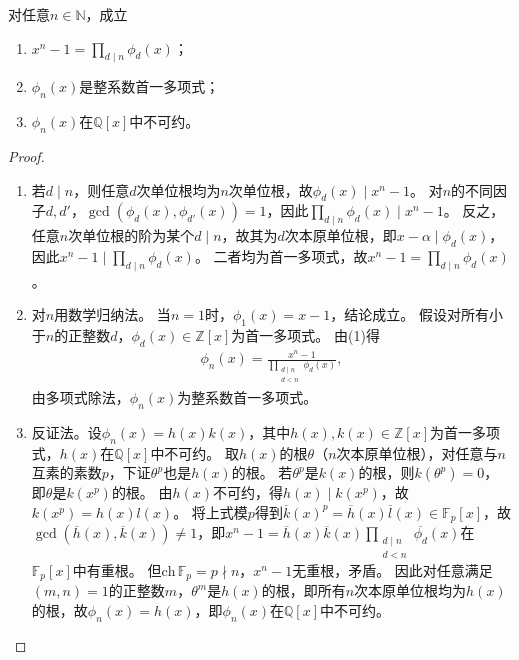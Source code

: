 \documentclass[../../main.tex]{subfiles}%
\begin{document}
\begin{theorem}
对任意$n\in\mathbb{N}$，成立
\begin{enumerate}[(1)]
\item $x^n-1=\prod\limits_{d\mid n}\phi_d(x)$；
\item $\phi_n(x)$是整系数首一多项式；
\item $\phi_n(x)$在$\mathbb{Q}[x]$中不可约。
\end{enumerate}
\end{theorem}
\begin{proof}
\begin{enumerate}[(1)]
\item 若$d\mid n$，则任意$d$次单位根均为$n$次单位根，故$\phi_d(x)\mid x^n-1$。
对$n$的不同因子$d,d'$，$\gcd(\phi_d(x),\phi_{d'}(x))=1$，因此$\prod\limits_{d\mid n}\phi_d(x)\mid x^n-1$。
反之，任意$n$次单位根的阶为某个$d\mid n$，故其为$d$次本原单位根，即$x-\alpha\mid\phi_d(x)$，因此$x^n-1\mid\prod\limits_{d\mid n}\phi_d(x)$。
二者均为首一多项式，故$x^n-1=\prod\limits_{d\mid n}\phi_d(x)$。

\item 对$n$用数学归纳法。
当$n=1$时，$\phi_1(x)=x-1$，结论成立。
假设对所有小于$n$的正整数$d$，$\phi_d(x)\in\mathbb{Z}[x]$为首一多项式。
由(1)得
\begin{align*}
\phi_n(x)=\frac{x^n-1}{\prod\limits_{\substack{d\mid n\\d<n}}\phi_d(x)},
\end{align*}
由多项式除法，$\phi_n(x)$为整系数首一多项式。

\item 反证法。设$\phi_n(x)=h(x)k(x)$，其中$h(x),k(x)\in\mathbb{Z}[x]$为首一多项式，$h(x)$在$\mathbb{Q}[x]$中不可约。
取$h(x)$的根$\theta$（$n$次本原单位根），对任意与$n$互素的素数$p$，下证$\theta^p$也是$h(x)$的根。
若$\theta^p$是$k(x)$的根，则$k(\theta^p)=0$，即$\theta$是$k(x^p)$的根。
由$h(x)$不可约，得$h(x)\mid k(x^p)$，故$k(x^p)=h(x)l(x)$。
将上式模$p$得到$\overline{k}(x)^p=\overline{h}(x)\overline{l}(x)\in\mathbb{F}_p[x]$，故$\gcd(\overline{h}(x),\overline{k}(x))\neq1$，即$x^n-1=\overline{h}(x)\overline{k}(x)\prod\limits_{\substack{d\mid n\\d<n}}\overline{\phi_d}(x)$在$\mathbb{F}_p[x]$中有重根。
但$\mathrm{ch}\,\mathbb{F}_p=p\nmid n$，$x^n-1$无重根，矛盾。
因此对任意满足$(m,n)=1$的正整数$m$，$\theta^m$是$h(x)$的根，即所有$n$次本原单位根均为$h(x)$的根，故$\phi_n(x)=h(x)$，即$\phi_n(x)$在$\mathbb{Q}[x]$中不可约。
\end{enumerate}

\end{proof}
\end{document}
